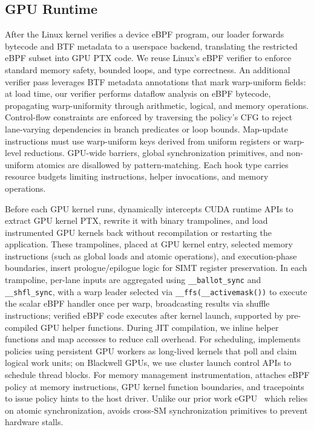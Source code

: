 \subsection{GPU Runtime}
\label{sec:impl-gpu}

After the Linux kernel verifies a \sys device eBPF program, our loader forwards bytecode and BTF metadata to a userspace backend, translating the restricted eBPF subset into GPU PTX code. We reuse Linux's eBPF verifier to enforce standard memory safety, bounded loops, and type correctness. An additional verifier pass leverages BTF metadata annotations that mark warp-uniform fields: at load time, our verifier performs dataflow analysis on eBPF bytecode, propagating warp-uniformity through arithmetic, logical, and memory operations. Control-flow constraints are enforced by traversing the policy's CFG to reject lane-varying dependencies in branch predicates or loop bounds. Map-update instructions must use warp-uniform keys derived from uniform registers or warp-level reductions. GPU-wide barriers, global synchronization primitives, and non-uniform atomics are disallowed by pattern-matching. Each hook type carries resource budgets limiting instructions, helper invocations, and memory operations. 

Before each GPU kernel runs, \sys dynamically intercepts CUDA runtime APIs to extract GPU kernel PTX, rewrite it with binary trampolines, and load instrumented GPU kernels back without recompilation or restarting the application. These trampolines, placed at GPU kernel entry, selected memory instructions (such as global loads and atomic operations), and execution-phase boundaries, insert prologue/epilogue logic for SIMT register preservation. In each trampoline, per-lane inputs are aggregated using \texttt{\_\_ballot\_sync} and \texttt{\_\_shfl\_sync}, with a warp leader selected via \texttt{\_\_ffs(\_\_activemask())} to execute the scalar eBPF handler once per warp, broadcasting results via shuffle instructions; verified eBPF code executes after kernel launch, supported by pre-compiled GPU helper functions. During JIT compilation, we inline helper functions and map accesses to reduce call overhead. For scheduling, \sys implements policies using persistent GPU workers as long-lived kernels that poll and claim logical work units; on Blackwell GPUs, we use cluster launch control APIs to schedule thread blocks. For memory management instrumentation, \sys attaches eBPF policy at memory instructions, GPU kernel function boundaries, and tracepoints to issue policy hints to the host driver. Unlike our prior work eGPU~\cite{egpu} which relies on atomic synchronization, \sys{} avoids cross-SM synchronization primitives to prevent hardware stalls.

